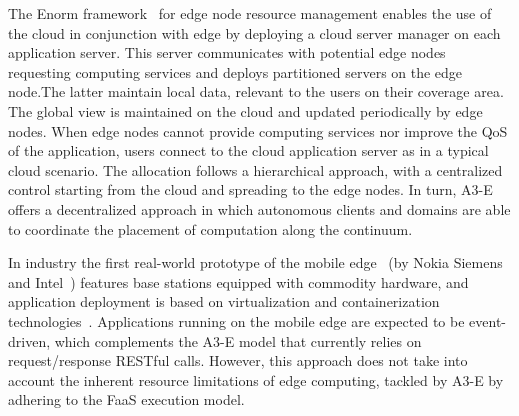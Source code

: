 
The Enorm framework~\cite{wang2017enorm} for edge node resource management enables the use of the cloud in conjunction with edge by deploying a cloud server manager on each application server. This server communicates with potential edge nodes requesting computing services and deploys partitioned servers on the edge node.The latter maintain local data, relevant to the users on their coverage area. The global view is maintained on the cloud and updated periodically by edge nodes. When edge nodes cannot provide computing services nor improve the QoS of the application, users connect to the cloud application server as in a typical cloud scenario. The allocation follows a hierarchical approach, with a centralized control starting from the cloud and spreading to the edge nodes. In turn, A3-E offers a decentralized approach in which autonomous clients and domains are able to coordinate the placement of computation along the continuum. 



In industry the first real-world prototype of the mobile edge~\cite{beck2014mobile} (by Nokia Siemens and Intel~\cite{NokiaMEC13}) features base stations equipped with commodity hardware, and application deployment is based on virtualization and containerization technologies~\cite{ismail2015icos}. Applications running on the mobile edge are expected to be event-driven, which complements the A3-E model that currently relies on request/response RESTful calls. However, this approach does not take into account the inherent resource limitations of edge computing, tackled by A3-E by adhering to the FaaS execution model.

